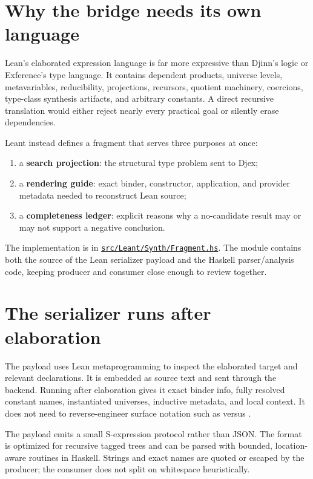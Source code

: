 \documentclass[10pt,letterpaper,oneside]{report}
\newcommand{\code}[1]{\texttt{\detokenize{#1}}}
\def\LeantBase{https://github.com/VladimirReshetnikov/Leant/blob/ada69d884480b93e74ee4b3daf77be38702ee07d/}
\newcommand{\lpath}[1]{\href{\LeantBase#1}{\nolinkurl{#1}}}
\newcommand{\term}[1]{\textbf{#1}}
\begin{document}
\section{Why the bridge needs its own language}

Lean's elaborated expression language is far more expressive than Djinn's logic or Exference's type language. It contains dependent products, universe levels, metavariables, reducibility, projections, recursors, quotient machinery, coercions, type-class synthesis artifacts, and arbitrary constants. A direct recursive translation would either reject nearly every practical goal or silently erase dependencies.

Leant instead defines a fragment that serves three purposes at once:

\begin{enumerate}
  \item a \term{search projection}: the structural type problem sent to Djex;
  \item a \term{rendering guide}: exact binder, constructor, application, and provider metadata needed to reconstruct Lean source;
  \item a \term{completeness ledger}: explicit reasons why a no-candidate result may or may not support a negative conclusion.
\end{enumerate}

The implementation is in \lpath{src/Leant/Synth/Fragment.hs}. The module contains both the source of the Lean serializer payload and the Haskell parser/analysis code, keeping producer and consumer close enough to review together.

\section{The serializer runs after elaboration}

The payload uses Lean metaprogramming to inspect the elaborated target and relevant declarations. It is embedded as source text and sent through the backend. Running after elaboration gives it exact binder info, fully resolved constant names, instantiated universes, inductive metadata, and local context. It does not need to reverse-engineer surface notation such as \code{A x B} versus \code{Prod A B}.

The payload emits a small S-expression protocol rather than JSON. The format is optimized for recursive tagged trees and can be parsed with bounded, location-aware routines in Haskell. Strings and exact names are quoted or escaped by the producer; the consumer does not split on whitespace heuristically.
\end{document}
